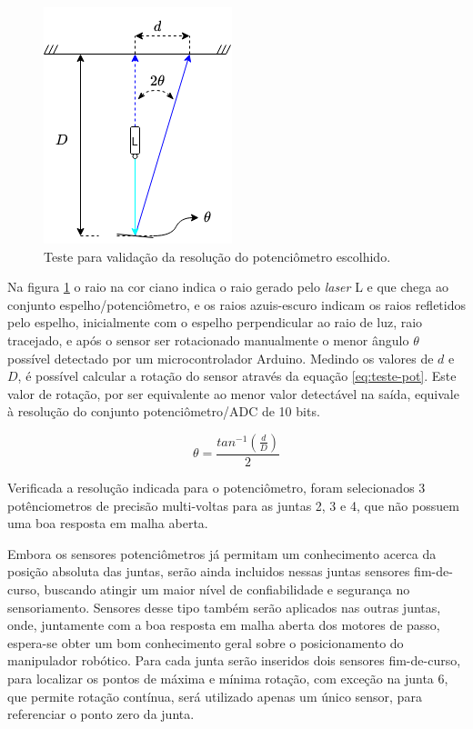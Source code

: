\begin{figure}[h!]
    \caption{Teste para validação da resolução do potenciômetro escolhido.}    
    \begin{centering}

        \includegraphics[width=0.3\columnwidth]{images/sensors/TestePot.png}
    
    \par\end{centering}

    \label{fig:teste-pot}
\end{figure}

Na figura \ref{fig:teste-pot} o raio na cor ciano indica o raio gerado pelo \textit{laser} L e que
chega ao conjunto espelho/potenciômetro, e 
os raios azuis-escuro indicam os raios refletidos pelo espelho, inicialmente com o espelho 
perpendicular ao raio de luz, raio tracejado, e após o sensor ser rotacionado manualmente o menor ângulo $\theta$
possível detectado por um microcontrolador Arduino. Medindo os valores de $d$ e $D$, é possível calcular a 
rotação do sensor através da equação \ref{eq:teste-pot}. Este valor de rotação, por ser equivalente ao 
menor valor detectável na saída, equivale à resolução do conjunto potenciômetro/ADC de 10 bits.

\begin{equation}
    \label{eq:teste-pot}
    \theta = \frac{tan^{-1}\left(\frac{d}{D}\right)}{2}
\end{equation}


Verificada a resolução indicada para o potenciômetro, foram selecionados 3 potênciometros de 
precisão multi-voltas para as juntas 2, 3 e 4, que não possuem uma boa resposta em malha 
aberta.

Embora os sensores potenciômetros já permitam um conhecimento acerca 
da posição absoluta das juntas, serão ainda incluidos nessas juntas 
sensores fim-de-curso, buscando atingir um maior nível de confiabilidade e 
segurança no sensoriamento. 
Sensores desse tipo também serão aplicados nas outras juntas, onde, 
juntamente com a boa resposta em malha aberta dos motores de passo, 
espera-se obter um bom conhecimento geral sobre o posicionamento do 
manipulador robótico. Para cada junta serão inseridos dois sensores fim-de-curso,
para localizar os pontos de máxima e mínima rotação, com exceção na junta 6,
que permite rotação contínua, será utilizado apenas um único sensor, 
para referenciar o ponto zero da junta.

